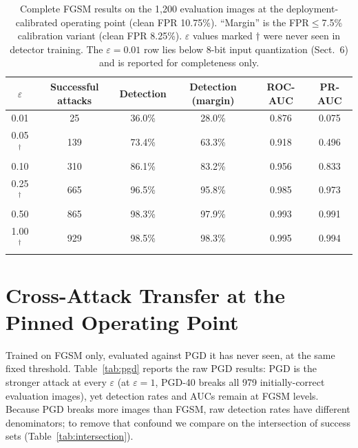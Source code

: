\documentclass[runningheads]{llncs}
\begin{document}
\begin{table}
\centering
\caption{Complete FGSM results on the 1{,}200 evaluation images at the
deployment-calibrated operating point (clean FPR 10.75\%). ``Margin'' is
the FPR$\le$7.5\% calibration variant (clean FPR 8.25\%). $\varepsilon$
values marked $\dagger$ were never seen in detector training. The
$\varepsilon=0.01$ row lies below 8-bit input quantization (Sect.~6)
and is reported for completeness only.}
\label{tab:deploycal}
\begin{tabular}{cccccc}
\toprule
$\varepsilon$ & Successful attacks & Detection & Detection (margin) & ROC-AUC & PR-AUC \\
\midrule
0.01           & 25  & 36.0\% & 28.0\% & 0.876 & 0.075 \\
0.05$^\dagger$ & 139 & 73.4\% & 63.3\% & 0.918 & 0.496 \\
0.10           & 310 & 86.1\% & 83.2\% & 0.956 & 0.833 \\
0.25$^\dagger$ & 665 & 96.5\% & 95.8\% & 0.985 & 0.973 \\
0.50           & 865 & 98.3\% & 97.9\% & 0.993 & 0.991 \\
1.00$^\dagger$ & 929 & 98.5\% & 98.3\% & 0.995 & 0.994 \\
\bottomrule
\end{tabular}
\end{table}

\section{Cross-Attack Transfer at the Pinned Operating Point}

Trained on FGSM only, evaluated against PGD it has never seen, at the
same fixed threshold. Table~\ref{tab:pgd} reports the raw PGD results:
PGD is the stronger attack at every $\varepsilon$ (at
$\varepsilon = 1$, PGD-40 breaks all 979 initially-correct evaluation
images), yet detection rates and AUCs remain at FGSM levels. Because PGD
breaks more images than FGSM, raw detection rates have different
denominators; to remove that confound we compare on the intersection of
success sets (Table~\ref{tab:intersection}).
\end{document}
